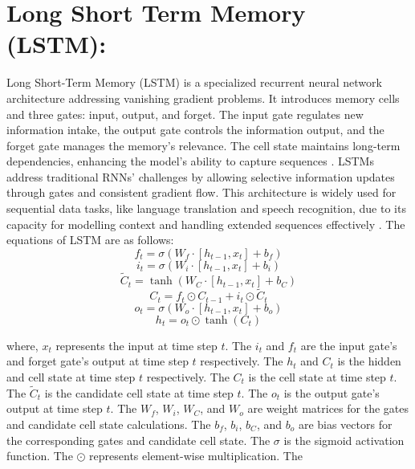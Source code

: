 \section{Long Short Term Memory (LSTM):}
Long Short-Term Memory (LSTM) is a specialized recurrent neural network architecture addressing vanishing gradient problems. It introduces memory cells and three gates: input, output, and forget. The input gate regulates new information intake, the output gate controls the information output, and the forget gate manages the memory's relevance. The cell state maintains long-term dependencies, enhancing the model's ability to capture sequences \cite{guillen2020deep}. LSTMs address traditional RNNs' challenges by allowing selective information updates through gates and consistent gradient flow. This architecture is widely used for sequential data tasks, like language translation and speech recognition, due to its capacity for modelling context and handling extended sequences effectively \cite{qiu2021river}. The equations of LSTM are as follows:
\begin{equation}
f_t = \sigma(W_f \cdot [h_{t-1}, x_t] + b_f)
\end{equation}
\begin{equation}
i_t = \sigma(W_i \cdot [h_{t-1}, x_t] + b_i)
\end{equation}
\begin{equation}
\tilde{C}_t = \tanh(W_C \cdot [h_{t-1}, x_t] + b_C)
\end{equation}
\begin{equation}
C_t = f_t \odot C_{t-1} + i_t \odot \tilde{C}_t
\end{equation}
\begin{equation}
o_t = \sigma(W_o \cdot [h_{t-1}, x_t] + b_o)
\end{equation}
\begin{equation}
h_t = o_t \odot \tanh(C_t)
\end{equation}


where, \(x_t\) represents the input at time step \(t\). The
\(i_t\) and \(f_t\) are the input gate's and forget gate's output at time step \(t\) respectively. The
\(h_t\) and \(C_t\) is the hidden and cell state at time step \(t\) respectively. The
\(C_t\) is the cell state at time step \(t\). The
\(\tilde{C}_t\) is the candidate cell state at time step \(t\). The
\(o_t\) is the output gate's output at time step \(t\). The
\(W_f\), \(W_i\), \(W_C\), and \(W_o\) are weight matrices for the gates and candidate cell state calculations. The
\(b_f\), \(b_i\), \(b_C\), and \(b_o\) are bias vectors for the corresponding gates and candidate cell state. The
\(\sigma\) is the sigmoid activation function. The
\(\odot\) represents element-wise multiplication. The


